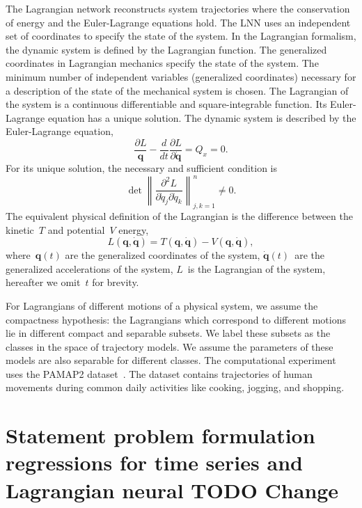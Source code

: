 \documentclass[12pt]{paper}
\begin{document}
The Lagrangian network reconstructs system trajectories where the conservation of energy and the Euler-Lagrange equations hold. The LNN  uses an independent set of coordinates to specify the state of the system. In the Lagrangian formalism, the dynamic system is defined by the Lagrangian function.  The generalized coordinates in Lagrangian mechanics specify the state of the system. The minimum number of independent variables (generalized coordinates) necessary for a description of the state of the mechanical system is chosen. The Lagrangian of the system is a continuous differentiable and square-integrable function. Its Euler-Lagrange equation has a unique solution. 
The dynamic system is described by the Euler-Lagrange equation,
\begin{equation}
\frac{\partial L}{\mathbf{q}}-\frac{d}{dt}\frac{\partial L}{\partial\dot{\mathbf{q}}}=Q_x=0.
      \label{eq:euler_larange}
\end{equation}
For its unique solution, the necessary and sufficient condition is 
\begin{equation}
    \det \left \| \frac{\partial^{2} L}{\partial \dot{q}_{j}\partial \dot{q}_{k}} \right \|_{j,k=1}^{n} \neq 0.
\end{equation}
The equivalent physical definition of the Lagrangian is the difference between the kinetic~$T$ and potential~$V$ energy,
\begin{equation}
L\left(\mathbf{q},\dot{\mathbf{q}}\right) = T\left(\mathbf{q},\dot{\mathbf{q}}\right)- V\left(\mathbf{q},\dot{\mathbf{q}}\right), 
\label{eq:L=T-V}
\end{equation}
where~$\mathbf{q}(t)$ are the generalized coordinates of the system, $\dot{\mathbf{q}}(t)$~are the generalized accelerations of the system, $L$~is the Lagrangian of the system, hereafter we omit~$t$ for brevity.

For Lagrangians of different motions of a physical system, we assume the compactness hypothesis: the Lagrangians which correspond to different motions lie in different compact and separable subsets. We label these subsets as the classes in the space of trajectory models. We assume the parameters of these models are also separable for different classes. The computational experiment uses the PAMAP2 dataset~\cite{TODO}. The dataset contains trajectories of human movements during common daily activities like cooking, jogging, and shopping.

\section{Statement problem formulation regressions for time series and Lagrangian neural TODO Change}
\end{document}
